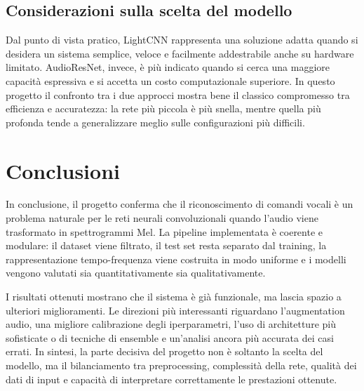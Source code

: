 \documentclass[a4paper,12pt]{article}
\begin{document}
\subsection{Considerazioni sulla scelta del modello}

Dal punto di vista pratico, LightCNN rappresenta una soluzione adatta quando si desidera un sistema semplice, veloce e facilmente addestrabile anche su hardware limitato. AudioResNet, invece, è più indicato quando si cerca una maggiore capacità espressiva e si accetta un costo computazionale superiore. In questo progetto il confronto tra i due approcci mostra bene il classico compromesso tra efficienza e accuratezza: la rete più piccola è più snella, mentre quella più profonda tende a generalizzare meglio sulle configurazioni più difficili.

\section{Conclusioni}

In conclusione, il progetto conferma che il riconoscimento di comandi vocali è un problema naturale per le reti neurali convoluzionali quando l'audio viene trasformato in spettrogrammi Mel. La pipeline implementata è coerente e modulare: il dataset viene filtrato, il test set resta separato dal training, la rappresentazione tempo-frequenza viene costruita in modo uniforme e i modelli vengono valutati sia quantitativamente sia qualitativamente.

I risultati ottenuti mostrano che il sistema è già funzionale, ma lascia spazio a ulteriori miglioramenti. Le direzioni più interessanti riguardano l'augmentation audio, una migliore calibrazione degli iperparametri, l'uso di architetture più sofisticate o di tecniche di ensemble e un'analisi ancora più accurata dei casi errati. In sintesi, la parte decisiva del progetto non è soltanto la scelta del modello, ma il bilanciamento tra preprocessing, complessità della rete, qualità dei dati di input e capacità di interpretare correttamente le prestazioni ottenute.
\end{document}
